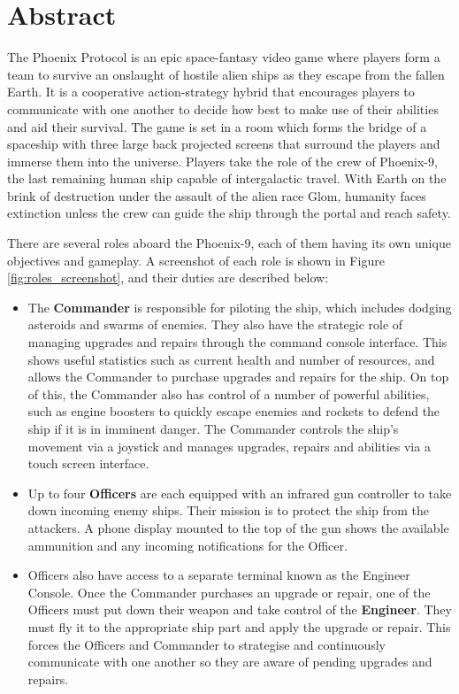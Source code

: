 \documentclass[a4paper,11pt]{article}
\begin{document}
\section{Abstract}
The Phoenix Protocol is an epic space-fantasy video game where players form a team to survive an onslaught of hostile alien ships as they escape from the fallen Earth. It is a cooperative action-strategy hybrid that encourages players to communicate with one another to decide how best to make use of their abilities and aid their survival. The game is set in a room which forms the bridge of a spaceship with three large back projected screens that surround the players and immerse them into the universe. 
Players take the role of the crew of Phoenix-9, the last remaining human ship capable of intergalactic travel. With Earth on the brink of destruction under the assault of the alien race Glom, humanity faces extinction unless the crew can guide the ship through the portal and reach safety.

There are several roles aboard the Phoenix-9, each of them having its own unique objectives and gameplay. A screenshot of each role is shown in Figure \ref{fig:roles_screenshot}, and their duties are described below:

\begin{itemize}[noitemsep,topsep=.5ex]
  \item The \textbf{Commander} is responsible for piloting the ship, which includes dodging asteroids and swarms of enemies. They also have the strategic role of managing upgrades and repairs through the command console interface. This shows useful statistics such as current health and number of resources, and allows the Commander to purchase upgrades and repairs for the ship. On top of this, the Commander also has control of a number of powerful abilities, such as engine boosters to quickly escape enemies and rockets to defend the ship if it is in imminent danger. 
  The Commander controls the ship's movement via a joystick and manages upgrades, repairs and abilities via a touch screen interface. 

  \item Up to four \textbf{Officers} are each equipped with an infrared gun controller to take down incoming enemy ships. Their mission is to protect the ship from the attackers. A phone display mounted to the top of the gun shows the available ammunition and any incoming notifications for the Officer.

  \item Officers also have access to a separate terminal known as the Engineer Console. Once the Commander purchases an upgrade or repair, one of the Officers must put down their weapon and take control of the \textbf{Engineer}. They must fly it to the appropriate ship part and apply the upgrade or repair. This forces the Officers and Commander to strategise and continuously communicate with one another so they are aware of pending upgrades and repairs.
\end{itemize}
\end{document}

